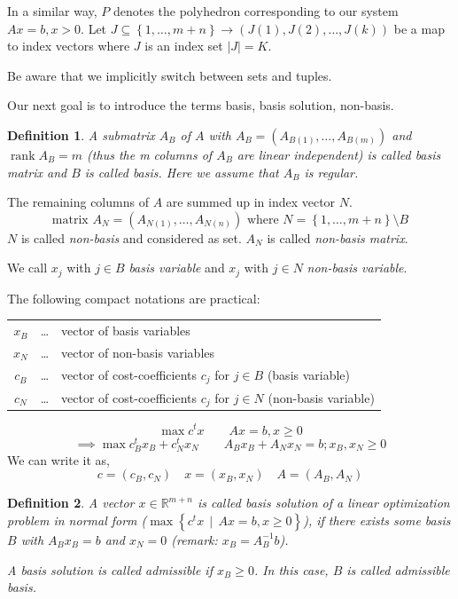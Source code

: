 \documentclass{article}
\numberwithin{lecref}{section}
\newtheorem*{Definition}{Definition}
\newcommand{\Abs}[1]{\left|#1\right|}
\newcommand{\Set}[1]{\left\{#1\right\}}
\newcommand{\SetDef}[2]{\left\{#1\,\mid\,#2\right\}}
\DeclareMathOperator{\rank}{rank}
\begin{document}
In a similar way, $P$ denotes the polyhedron corresponding to our system $Ax = b, x > 0$.
Let $J \subseteq \Set{1, \dots, m+n} \to (J(1), J(2), \dots, J(k))$ be a map to index vectors where $J$ is an index set $\Abs{J} = K$.

Be aware that we implicitly switch between sets and tuples.

Our next goal is to introduce the terms basis, basis solution, non-basis.

\begin{Definition}
  A submatrix $A_B$ of $A$ with $A_{B} = (A_{B(1)}, \dots, A_{B(m)})$ and $\rank{A_B} = m$ (thus the m columns of $A_B$ are linear independent)
  is called \emph{basis matrix} and $B$ is called \emph{basis}. Here we assume that $A_B$ is regular.
\end{Definition}

The remaining columns of $A$ are summed up in index vector $N$.
\[ \text{matrix } A_N = (A_{N(1)}, \dots, A_{N(n)}) \text{ where } N = \Set{1, \dots, m+n} \setminus B \]
$N$ is called \emph{non-basis} and considered as set. $A_N$ is called \emph{non-basis matrix}.

We call $x_j$ with $j \in B$ \emph{basis variable} and $x_j$ with $j \in N$ \emph{non-basis variable}.

The following compact notations are practical: \\
\begin{tabular}{ccl}
	$x_B$ & \dots & vector of basis variables \\
	$x_N$ & \dots & vector of non-basis variables \\
	$c_B$ & \dots & vector of cost-coefficients $c_j$ for $j \in B$ (basis variable) \\
	$c_N$ & \dots & vector of cost-coefficients $c_j$ for $j \in N$ (non-basis variable)
\end{tabular}
\[ \max c^t x \qquad Ax = b, x \geq 0 \]
\[ \implies \max c_B^t x_B + c_N^t x_N \qquad A_B x_B + A_N x_N = b; x_B, x_N \geq 0 \]
We can write it as,
\[ c = (c_B, c_N) \quad x = (x_B, x_N) \quad A = (A_B, A_N) \]

\begin{Definition}
  A vector $x \in \mathbb R^{m + n}$ is called \emph{basis solution} of a linear optimization problem in normal form ($\max\SetDef{c^t x}{Ax = b, x \geq 0}$), if there exists some basis $B$ with $A_B x_B = b$ and $x_N = 0$ (remark: $x_B = A_B^{-1} b$).

  A basis solution is called \emph{admissible} if $x_B \geq 0$. In this case, $B$ is called \emph{admissible basis}.
\end{Definition}
\end{document}
